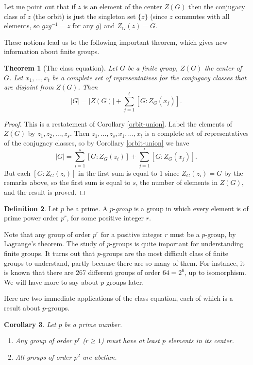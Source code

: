 \documentclass[11pt,oneside]{article}
\newtheorem{thm}{Theorem}[section]
\newtheorem{cor}[thm]{Corollary}
\theoremstyle{definition}
\newtheorem{defn}[thm]{Definition}
\begin{document}
Let me point out that if $z$ is an element of the center $Z(G)$ then
the conjugacy class of $z$ (the orbit) is just the singleton set
$\{z\}$ (since $z$ commutes with all elements, so $gzg^{-1} = z$ for
any $g$) and $Z_G(z) = G$.


These notions lead us to the following important theorem, which gives
new information about finite groups.

\begin{thm}[The class equation]\label{classeqn}
Let $G$ be a finite group, $Z(G)$ the center of $G$. Let $x_1, \dots,
x_t$ be a complete set of representatives for the conjugacy classes
that are disjoint from $Z(G)$. Then
\[
   |G| = |Z(G)| + \sum_{j=1}^t [G:Z_G(x_j)].
\]
\end{thm}


\begin{proof}
This is a restatement of Corollary \ref{orbit-union}. Label the
elements of $Z(G)$ by $z_1, z_2, \dots, z_s$. Then $z_1, \dots, z_s,
x_1, \dots, x_t$ is a complete set of representatives of the conjugacy
classes, so by Corollary \ref{orbit-union} we have
\[
  |G| = \sum_{i=1}^s [G:Z_G(z_i)] + \sum_{j=1}^t [G:Z_G(x_j)].
\]
But each $[G:Z_G(z_i)]$ in the first sum is equal to 1 since $Z_G(z_i)
= G$ by the remarks above, so the first sum is equal to $s$, the
number of elements in $Z(G)$, and the result is proved.
\end{proof}



\begin{defn}
Let $p$ be a prime. A $p$-{\em group} is a group in which every
element is of prime power order $p^r$, for some positive integer $r$.
\end{defn}

Note that any group of order $p^r$ for a positive integer $r$ must be
a $p$-group, by Lagrange's theorem.  The study of $p$-groups is quite
important for understanding finite groups. It turns out that
$p$-groups are the most difficult class of finite groups to
understand, partly because there are so many of them.  For instance,
it is known that there are 267 different groups of order $64 = 2^6$,
up to isomorphism. We will have more to say about $p$-groups later.


Here are two immediate applications of the class equation, each of
which is a result about $p$-groups.



\begin{cor} Let $p$ be a prime number. 
\begin{enumerate}
\item Any group of order $p^r$ ($r \ge 1$) must have at least $p$
  elements in its center.

\item All groups of order $p^2$ are abelian. 
\end{enumerate}
\end{cor}
\end{document}
